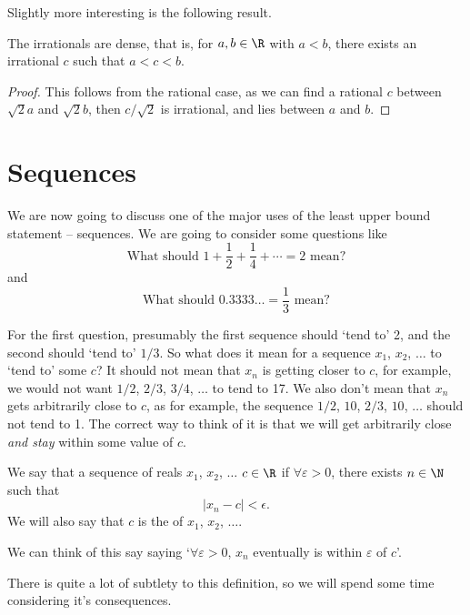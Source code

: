 \documentclass[a4paper]{scrreprt}
\begin{document}
Slightly more interesting is the following result.
\begin{theorem}
	The irrationals are dense, that is, for $a, b\in\R$ with $a<b$, there exists an irrational $c$ such that $a < c < b$.
\end{theorem}
\begin{proof}
	This follows from the rational case, as we can find a rational $c$ between $\sqrt{2}a$ and $\sqrt{2}b$, then $c/\sqrt{2}$ is irrational, and lies between $a$ and $b$.
\end{proof}

\section{Sequences}

We are now going to discuss one of the major uses of the least upper bound statement -- sequences. We are going to consider some questions like
$$
\text{What should } 1 + \frac{1}{2} + \frac{1}{4} + \cdots = 2 \text{ mean?}
$$
and 
$$
\text{What should } 0.3333\dots = \frac{1}{3} \text{ mean?}
$$

For the first question, presumably the first sequence should `tend to' 2, and the second should `tend to' $1/3$. So what does it mean for a sequence $x_1$, $x_2$, $\dots$ to `tend to' some $c$? It should not mean that $x_n$ is getting closer to $c$, for example, we would not want $1/2$, $2/3$, $3/4$, $\dots$ to tend to 17. We also don't mean that $x_n$ gets arbitrarily close to $c$, as for example, the sequence $1/2$, $10$, $2/3$, $10$, $\dots$ should not tend to 1.
The correct way to think of it is that we will get arbitrarily close \emph{and stay} within some value of $c$.

\begin{definition}
	We say that a sequence of reals $x_1$, $x_2$, $\dots$  $c \in \R$ if $\forall \varepsilon > 0$, there exists $n \in \N$ such that
	$$
	|x_n - c| < \epsilon.
	$$
	We will also say that $c$ is the  of $x_1$, $x_2$, $\dots$.
\end{definition}

\begin{remark}[Informal]
	We can think of this say saying `$\forall \varepsilon > 0$, $x_n$ eventually is within $\varepsilon$ of $c$'.
\end{remark}

There is quite a lot of subtlety to this definition, so we will spend some time considering it's consequences.
\end{document}
